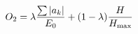 \documentclass[preview]{standalone}
\begin{document}
\begin{align*}
\special{dvisvgm:raw <g id='unique000'>}O_2 = \lambda\frac{\sum|a_k|}{E_0}+(1-\lambda)\frac{H}{H_{\max}}\special{dvisvgm:raw </g>}
\end{align*}
\end{document}
